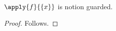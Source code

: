 

\begin{proposition}\label{notion_presentation_nested}
    $\apply{f}{\{x\}}$ is notion guarded.
\end{proposition}
\begin{proof}
    Follows.
\end{proof}
